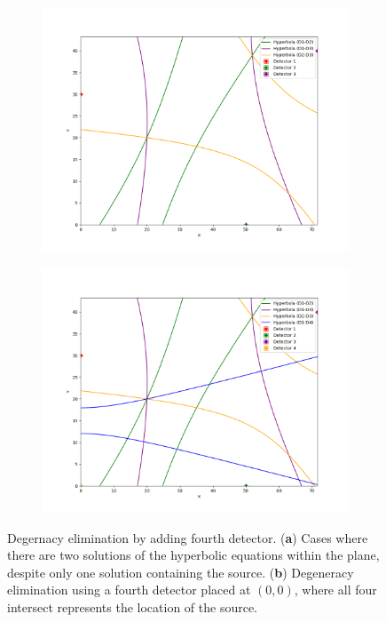 \begin{figure}[h!]
    \centering
    \begin{subfigure}[b]{.5\textwidth}
      \centering
      \includegraphics[width=\textwidth]{images/2-loc.png}
      \caption{}
      \label{fig:2-loc}
    \end{subfigure}%
    \begin{subfigure}[b]{.5\textwidth}
      \centering
      \includegraphics[width=\textwidth]{images/4-det.png}
      \caption{}
      \label{fig:4-det}
    \end{subfigure}
    \caption{Degernacy elimination by adding fourth detector. (\textbf{a}) Cases where there are two solutions of the hyperbolic equations within the plane, despite only one solution containing the source. (\textbf{b}) Degeneracy elimination using a fourth detector placed at $(0,0)$, where all four intersect represents the location of the source.}
    \label{fig:TDoA-ToA}
\end{figure}
\newpage


